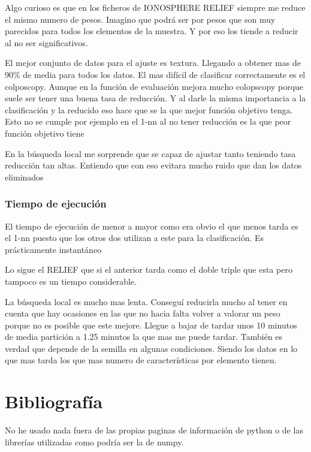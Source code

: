 \documentclass[titlepage]{article}
\begin{document}
	Algo curioso es que en los ficheros de IONOSPHERE RELIEF siempre me reduce el mismo numero de pesos. Imagino que podrá ser por pesos que son muy parecidos para todos los elementos de la muestra. Y por eso los tiende a reducir al no ser significativos.
	
	El mejor conjunto de datos para el ajuste es textura. Llegando a obtener mas de 90\% de media para todos los datos. El mas difícil de clasificar correctamente es el colposcopy. Aunque en la función de evaluación mejora mucho colopscopy porque suele ser tener una buena tasa de reducción. Y al darle la misma importancia a la clasificación y la reducido eso hace que se la que mejor función objetivo tenga. Esto no se cumple por ejemplo en el 1-nn al no tener reducción es la que peor función objetivo tiene
	
	En la búsqueda local me sorprende que se capaz de ajustar tanto teniendo tasa reducción tan altas. Entiendo que con eso evitara mucho ruido que dan los datos eliminados
	
	\subsubsection{Tiempo de ejecución}
	El tiempo de ejecución de menor a mayor como era obvio el que menos tarda es el 1-nn puesto que los otros dos utilizan a este para la clasificación. Es prácticamente instantáneo
	
	Lo sigue el RELIEF que si el anterior tarda como el doble triple que esta pero tampoco es un tiempo considerable.
	
	La búsqueda local es mucho mas lenta. Conseguí reducirla mucho al tener en cuenta que hay ocasiones en las que no hacia falta volver a valorar un peso porque no es posible que este mejore. Llegue a bajar de tardar unos 10 minutos de media partición a 1.25 minutos la que mas me puede tardar. También es verdad que depende de la semilla en algunas condiciones. Siendo los datos en lo que mas tarda los que mas numero de características por elemento tienen.
	
	

	\section{Bibliografía}
	No he usado nada fuera de las propias paginas de información de python o de las librerías utilizadas como podría ser la de numpy.

  
\end{document}
